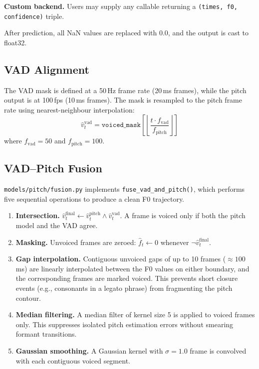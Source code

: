 \documentclass[11pt,letterpaper]{article}
\newcommand{\fh}{\hat{f}}
\newcommand{\vh}{\hat{v}}
\begin{document}
\textbf{Custom backend.}
Users may supply any callable returning a \texttt{(times, f0, confidence)}
triple.

After prediction, all NaN values are replaced with 0.0, and the output is
cast to float32.

\subsection{VAD Alignment}

The VAD mask is defined at a 50\,Hz frame rate (20\,ms frames), while the
pitch output is at 100\,fps (10\,ms frames).
The mask is resampled to the pitch frame rate using nearest-neighbour
interpolation:
\[
  \vh_t^\text{vad} = \texttt{voiced\_mask}\!\left[\left\lfloor
      \frac{t \cdot f_\text{vad}}{f_\text{pitch}}
    \right\rfloor\right]
\]
where $f_\text{vad}=50$ and $f_\text{pitch}=100$.

\subsection{VAD--Pitch Fusion}

\texttt{models/pitch/fusion.py} implements \texttt{fuse\_vad\_and\_pitch()},
which performs five sequential operations to produce a clean F0 trajectory.

\begin{enumerate}[noitemsep]
  \item \textbf{Intersection.}
        $\vh_t^\text{final} \leftarrow \vh_t^\text{pitch} \wedge
        \vh_t^\text{vad}$.
        A frame is voiced only if both the pitch model and the VAD agree.
  \item \textbf{Masking.}
        Unvoiced frames are zeroed: $\fh_t \leftarrow 0$ whenever
        $\neg\vh_t^\text{final}$.
  \item \textbf{Gap interpolation.}
        Contiguous unvoiced gaps of up to 10 frames ($\approx 100$\,ms) are
        linearly interpolated between the F0 values on either boundary, and
        the corresponding frames are marked voiced.
        This prevents short closure events (e.g., consonants in a legato
        phrase) from fragmenting the pitch contour.
  \item \textbf{Median filtering.}
        A median filter of kernel size 5 is applied to voiced frames only.
        This suppresses isolated pitch estimation errors without smearing
        formant transitions.
  \item \textbf{Gaussian smoothing.}
        A Gaussian kernel with $\sigma = 1.0$ frame is convolved with each
        contiguous voiced segment.
\end{enumerate}
\end{document}
